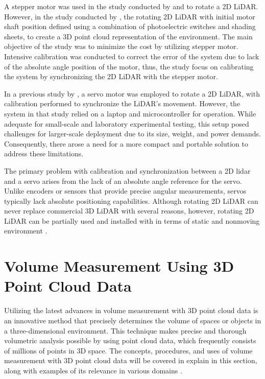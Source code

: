 A stepper motor was used in the study conducted by \citet{yuan2021} and \citet{kang2018} to rotate a 2D LiDAR. However, in the study conducted by \citet{yuan2021}, the rotating 2D LiDAR with initial motor shaft position defined using a combination of photoelectric switches and shading sheets, to create a 3D point cloud representation of the environment. The main objective of the study was to minimize the cost by utilizing stepper motor. Intensive calibration was conducted to correct the error of the system due to lack of the absolute angle position of the motor, thus, the study focus on calibrating the system by synchronizing the 2D LiDAR with the stepper motor.

In a previous study by \citet{clar2022}, a servo motor was employed to rotate a 2D LiDAR, with calibration performed to synchronize the LiDAR's movement. However, the system in that study relied on a laptop and microcontroller for operation. While adequate for small-scale and laboratory experimental testing, this setup posed challenges for larger-scale deployment due to its size, weight, and power demands. Consequently, there arose a need for a more compact and portable solution to address these limitations.

The primary problem with calibration and synchronization between a 2D lidar and a servo arises from the lack of an absolute angle reference for the servo. Unlike encoders or sensors that provide precise angular measurements, servos typically lack absolute positioning capabilities. Although rotating 2D LiDAR can never replace commercial 3D LiDAR with several reasons, however, rotating 2D LiDAR can be partially used and installed with in terms of static and nonmoving environment \citep{bi2021}.

\section{Volume Measurement Using 3D Point Cloud Data}

Utilizing the latest advances in volume measurement with 3D point cloud data is an innovative method that precisely determines the volume of spaces or objects in a three-dimensional environment. This technique makes precise and thorough volumetric analysis possible by using point cloud data, which frequently consists of millions of points in 3D space. The concepts, procedures, and uses of volume measurement with 3D point cloud data will be covered in explain in this section, along with examples of its relevance in various domains \citep{zhi2016,meng2023}.

